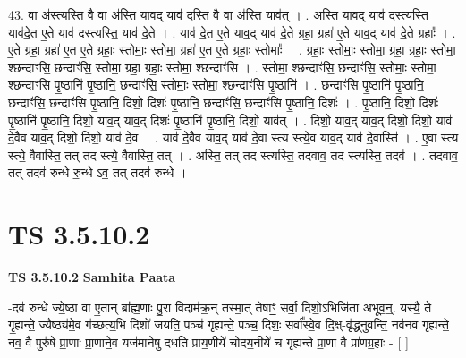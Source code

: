 \documentclass[17pt]{extarticle}
\begin{document}
43. वा अ॑स्त्यस्ति॒ वै वा अ॑स्ति॒ याव॒द् याव॑ दस्ति॒ वै वा अ॑स्ति॒ याव॑त् । . अ॒स्ति॒ याव॒द् याव॑ दस्त्यस्ति॒ याव॑दे॒त ए॒ते याव॑ दस्त्यस्ति॒ याव॑ दे॒ते । . याव॑ दे॒त ए॒ते याव॒द् याव॑ दे॒ते ग्रहा॒ ग्रहा॑ ए॒ते याव॒द् याव॑ दे॒ते ग्रहाः᳚ । . ए॒ते ग्रहा॒ ग्रहा॑ ए॒त ए॒ते ग्रहाः॒ स्तोमाः॒ स्तोमा॒ ग्रहा॑ ए॒त ए॒ते ग्रहाः॒ स्तोमाः᳚ । . ग्रहाः॒ स्तोमाः॒ स्तोमा॒ ग्रहा॒ ग्रहाः॒ स्तोमा॒ श्छन्दाꣳ॑सि॒ छन्दाꣳ॑सि॒ स्तोमा॒ ग्रहा॒ ग्रहाः॒ स्तोमा॒ श्छन्दाꣳ॑सि । . स्तोमा॒ श्छन्दाꣳ॑सि॒ छन्दाꣳ॑सि॒ स्तोमाः॒ स्तोमा॒ श्छन्दाꣳ॑सि पृ॒ष्ठानि॑ पृ॒ष्ठानि॒ छन्दाꣳ॑सि॒ स्तोमाः॒ स्तोमा॒ श्छन्दाꣳ॑सि पृ॒ष्ठानि॑ । . छन्दाꣳ॑सि पृ॒ष्ठानि॑ पृ॒ष्ठानि॒ छन्दाꣳ॑सि॒ छन्दाꣳ॑सि पृ॒ष्ठानि॒ दिशो॒ दिशः॑ पृ॒ष्ठानि॒ छन्दाꣳ॑सि॒ छन्दाꣳ॑सि पृ॒ष्ठानि॒ दिशः॑ । . पृ॒ष्ठानि॒ दिशो॒ दिशः॑ पृ॒ष्ठानि॑ पृ॒ष्ठानि॒ दिशो॒ याव॒द् याव॒द् दिशः॑ पृ॒ष्ठानि॑ पृ॒ष्ठानि॒ दिशो॒ याव॑त् । . दिशो॒ याव॒द् याव॒द् दिशो॒ दिशो॒ याव॑ दे॒वैव याव॒द् दिशो॒ दिशो॒ याव॑ दे॒व । . याव॑ दे॒वैव याव॒द् याव॑ दे॒वा स्त्य स्त्ये॒व याव॒द् याव॑ दे॒वास्ति॑ । . ए॒वा स्त्य स्त्ये॒ वैवास्ति॒ तत् तद स्त्ये॒ वैवास्ति॒ तत् । . अस्ति॒ तत् तद स्त्यस्ति॒ तदवाव॒ तद स्त्यस्ति॒ तदव॑ । . तदवाव॒ तत् तदव॑ रुन्धे रु॒न्धे ऽव॒ तत् तदव॑ रुन्धे । \newline
\pagebreak
{}

\section{ TS 3.5.10.2 }

\textbf{TS 3.5.10.2 } \newline
\textbf{Samhita Paata} \newline

-दव॑ रुन्धे ज्ये॒ष्ठा वा ए॒तान् ब्रा᳚ह्म॒णाः पु॒रा विदाम॑क्र॒न् तस्मा॒त् तेषाꣳ॒॒ सर्वा॒ दिशो॒ऽभिजि॑ता अभूव॒न्॒. यस्यै॒ ते गृ॒ह्यन्ते॒ ज्यैष्ठ्य॑मे॒व ग॑च्छत्य॒भि दिशो॑ जयति॒ पञ्च॑ गृह्यन्ते॒ पञ्च॒ दिशः॒ सर्वा᳚स्वे॒व दि॒क्ष्-वृ॑द्ध्नुवन्ति॒ नव॑नव गृह्यन्ते॒ नव॒ वै पुरु॑षे प्रा॒णाः प्रा॒णाने॒व यज॑मानेषु दधति प्राय॒णीये॑ चोदय॒नीये॑ च गृह्यन्ते प्रा॒णा वै प्रा॑णग्र॒हाः - [  ] \newline
\end{document}

